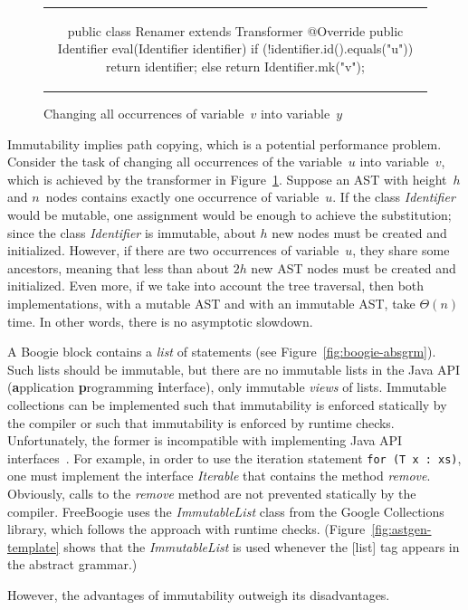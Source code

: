 \documentclass[a4paper]{article}
\newcommand{\jmlCode}{\lstinline[style=jml,basicstyle=\normalsize]}
\def\fb#1{{\bf #1}} %
\newcommand{\bc}{\begin{figure}\centering\begin{tabular}{c}} %
\newcommand{\ec}[2]{\end{tabular}\caption{#1}\label{#2}\end{figure}} %
\theoremstyle{slanted}
\theoremstyle{definition}
\theoremstyle{remark}
\begin{document}
\bc
\begin{jml}
public class Renamer extends Transformer {
  @Override public Identifier eval(Identifier identifier) {
    if (!identifier.id().equals("u")) return identifier;
    else return Identifier.mk("v");
  }
}
\end{jml}
\ec{Changing all occurrences of variable~$v$ into variable~$y$}
{lst:example-transformer}

Immutability implies path copying, which is a
potential performance problem. Consider the task of
changing all occurrences of the variable~$u$ into
variable~$v$, which is achieved by the transformer in
Figure~\ref{lst:example-transformer}. Suppose an AST with
height~$h$ and $n$~nodes contains exactly one occurrence of
variable~$u$. If the class \textit{Identifier} would be mutable,
one assignment would be enough to achieve the substitution;
since the class \textit{Identifier} is immutable, about $h$ new
nodes must be created and initialized. However, if there are
two occurrences of variable~$u$, they share some ancestors,
meaning that less than about $2h$ new AST nodes must be created
and initialized. Even more, if we take into account the tree
traversal, then both implementations, with a mutable AST and with
an immutable AST, take $\Theta(n)$ time. In other words, there is
no asymptotic slowdown.

A Boogie block contains a \emph{list} of statements (see
Figure~\ref{fig:boogie-absgrm}). Such lists should be immutable,
but there are no immutable lists in the Java API (\fb application
\fb programming \fb interface), only immutable \emph{views} of
lists. Immutable collections can be implemented such that
immutability is enforced statically by the compiler or such
that immutability is enforced by runtime checks. Unfortunately,
the former is incompatible with implementing Java API
interfaces~\cite{javaCollectFaq}. For example, in order to use
the iteration statement
\jmlCode|for (T x : xs)|,
one must implement the interface \textit{Iterable} that
contains the method \textit{remove}. Obviously, calls to
the \textit{remove} method are not prevented statically by
the compiler. FreeBoogie uses the \textit{ImmutableList}
class from the Google Collections~\cite{google-collect}
library, which follows the approach with runtime checks.
(Figure~\ref{fig:astgen-template} shows that the
\textit{ImmutableList} is used whenever the [list] tag appears in
the abstract grammar.)

However, the advantages of immutability outweigh its
disadvantages.
\end{document}
